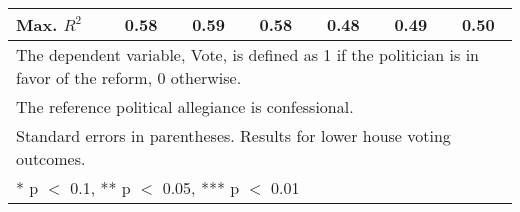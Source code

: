 \begin{table}
\begin{tabular}[t]{lcccccc}
Max. $R^2$ & \num{0.58} & \num{0.59} & \num{0.58} & \num{0.48} & \num{0.49} & \num{0.50}\\
\bottomrule
\multicolumn{7}{l}{\rule{0pt}{1em}The dependent variable, Vote, is defined as 1 if the politician is in favor of the reform, 0 otherwise.}\\
\multicolumn{7}{l}{\rule{0pt}{1em}The reference political allegiance is confessional.}\\
\multicolumn{7}{l}{\rule{0pt}{1em}Standard errors in parentheses. Results for lower house voting outcomes.}\\
\multicolumn{7}{l}{\rule{0pt}{1em}* p $<$ 0.1, ** p $<$ 0.05, *** p $<$ 0.01}\\
\end{tabular}
\end{table}
